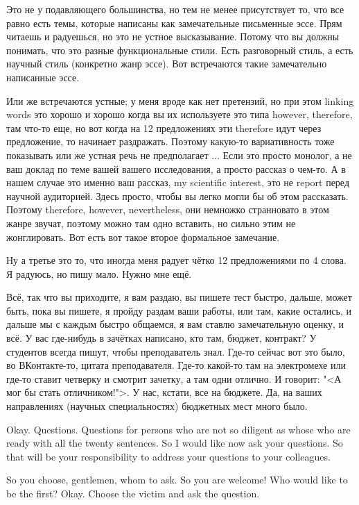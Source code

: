 \documentclass[main.tex]{subfiles}
\begin{document}
Это не у подавляющего большинства, но тем не менее присутствует то, что все равно есть темы, которые написаны как замечательные письменные эссе.
Прям читаешь и радуешься, но это не устное высказывание.
Потому что вы должны понимать, что это разные функциональные стили.
Есть разговорный стиль, а есть научный стиль (конкретно жанр эссе).
Вот встречаются такие замечательно написанные эссе.

Или же встречаются устные; у меня вроде как нет претензий, но при этом linking words это хорошо и хорошо когда вы их используете это типа however, therefore, там что-то еще, но вот когда на 12 предложениях эти therefore идут через предложение, то начинает раздражать.
Поэтому какую-то вариативность тоже показывать или же устная речь не предполагает ...
Если это просто монолог, а не ваш доклад по теме вашей вашего исследования, а просто рассказ о чем-то.
А в нашем случае это именно ваш рассказ, my scientific interest, это не report перед научной аудиторией.
Здесь просто, чтобы вы легко могли бы об этом рассказать.
Поэтому therefore, however, nevertheless, они немножко странновато в этом жанре звучат, поэтому можно там одно вставить, но сильно этим не жонглировать.
Вот есть вот такое второе формальное замечание.

Ну а третье это то, что иногда меня радует чётко 12 предложениями по 4 слова.
Я радуюсь, но пишу мало.
Нужно мне ещё.

Всё, так что вы приходите, я вам раздаю, вы пишете тест быстро, дальше, может быть, пока вы пишете, я пройду раздам ваши работы, или там, какие остались, и дальше мы с каждым быстро общаемся, я вам ставлю замечательную оценку, и всё.
У вас где-нибудь в зачётках написано, кто там, бюджет, контракт?
У студентов всегда пишут, чтобы преподаватель знал.
Где-то сейчас вот это было, во ВКонтакте-то, цитата преподавателя.
Где-то какой-то там на электромехе или где-то ставит четверку и смотрит зачетку, а там одни отлично.
И говорит: "<А мог бы стать отличником!">.
У нас, кстати, все на бюджете.
Да, на ваших направлениях (научных специальностях) бюджетных мест много было.

\newpage
{}

Okay.
Questions.
Questions for persons who are not so diligent as whose who are ready with all the twenty sentences.
So I would like now ask your questions.
So that will be your responsibility to address your questions to your colleagues.

So you choose, gentlemen, whom to ask.
So you are welcome!
Who would like to be the first?
Okay.
Choose the victim and ask the question.
\end{document}
